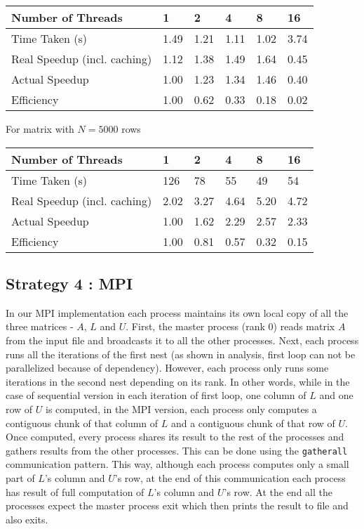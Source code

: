 \documentclass{article}
\begin{document}
\begin{table}[H]
\centering
\begin{tabular}{l|lllll}
Number of Threads            & 1    & 2    & 4    & 8    & 16   \\ \hline
Time Taken (s)               & 1.49 & 1.21 & 1.11 & 1.02 & 3.74 \\
Real Speedup (incl. caching) & 1.12 & 1.38 & 1.49 & 1.64 & 0.45 \\
Actual Speedup               & 1.00 & 1.23 & 1.34 & 1.46 & 0.40 \\
Efficiency                   & 1.00 & 0.62 & 0.33 & 0.18 & 0.02
\end{tabular}
\end{table}

For matrix with $N=5000$ rows

\begin{table}[H]
\centering
\begin{tabular}{l|lllll}
Number of Threads            & 1    & 2    & 4    & 8    & 16   \\ \hline
Time Taken (s)               & 126  & 78   & 55   & 49   & 54   \\
Real Speedup (incl. caching) & 2.02 & 3.27 & 4.64 & 5.20 & 4.72 \\
Actual Speedup               & 1.00 & 1.62 & 2.29 & 2.57 & 2.33 \\
Efficiency                   & 1.00 & 0.81 & 0.57 & 0.32 & 0.15
\end{tabular}
\end{table}

\subsection{Strategy 4 : MPI}
In our MPI implementation each process maintains its own local copy of all the three matrices - $A$, $L$ and $U$.
First, the master process (rank 0) reads matrix $A$ from the input file and broadcasts it to all the other processes.
Next, each process runs all the iterations of the first nest (as shown in analysis, first loop can not be parallelized because of dependency).
However, each process only runs some iterations in the second nest depending on its rank.
In other words, while in the case of sequential version in each iteration of first loop, one column of $L$ and one row of $U$ is computed, in the MPI version,
each process only computes a contiguous chunk of that column of $L$ and a contiguous chunk of that row of $U$.
Once computed, every process shares its result to the rest of the processes and gathers results from the other processes.
This can be done using the \verb+gatherall+ communication pattern. This way, although each process computes only a small part of $L$'s column and $U$'s row, at the end of this communication each process has result of full computation of $L$'s column and $U$'s row. At the end all the processes expect the master process exit which then prints the result to file and also exits.
\end{document}
